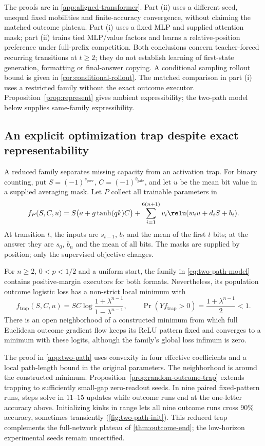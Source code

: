 The proofs are in \cref{app:aligned-transformer}. Part (ii) uses a different seed,
unequal fixed mobilities and finite-accuracy convergence, without claiming the
matched outcome plateau. Part (i) uses a fixed MLP and supplied attention mask; part (ii) trains tied
MLP/value factors and learns a relative-position preference under full-prefix
competition. Both conclusions concern teacher-forced recurring transitions
at $t\ge2$; they do not establish learning of first-state generation,
formatting or final-answer copying. A conditional sampling rollout bound is given in \cref{cor:conditional-rollout}.
The matched comparison in part (i) uses a restricted family without the exact
outcome executor. Proposition~\ref{prop:represent} gives ambient expressibility;
the two-path model below supplies same-family expressibility.

\subsection{An explicit optimization trap despite exact representability}
\label{sec:two-path-trap}
A reduced family separates missing capacity from an activation trap. For binary
counting, put $S=(-1)^{s_{\mathrm{prev}}}$, $C=(-1)^{b_{\mathrm{gate}}}$,
and let $u$ be the mean bit value in a supplied averaging mask. Let $P$ collect all trainable parameters in
\begin{equation}
 f_P(S,C,u)=S\bigl(a+g\tanh(qk)C\bigr)
 +\sum_{i=1}^{6(n+1)}v_i\relu(w_i u+d_iS+b_i).
 \label{eq:two-path-model}
\end{equation}
At transition $t$, the inputs are $s_{t-1}$, $b_t$ and the mean of the first
$t$ bits; at the answer they are $s_0$, $b_n$ and the mean of all bits.
The masks are supplied by position; only the supervised objective changes.

\begin{proposition}
\label{prop:two-path-trap}
For $n\ge2$, $0<p<1/2$ and a uniform start, the family in
\cref{eq:two-path-model} contains positive-margin executors for both formats.
Nevertheless, its population outcome logistic loss has a non-strict local minimum
with
\[
 f_{\mathrm{trap}}(S,C,u)=S C\log\frac{1+\lambda^{n-1}}{1-\lambda^{n-1}},
 \qquad \Pr(Yf_{\mathrm{trap}}>0)=\frac{1+\lambda^{n-1}}2<1.
\]
There is an open neighborhood of a constructed minimum from which full
Euclidean outcome gradient flow keeps its ReLU pattern fixed and converges
to a minimum with these logits, although the family's global loss infimum is zero.
\end{proposition}
The proof in \cref{app:two-path} uses convexity in four effective coefficients
and a local path-length bound in the original parameters. The neighborhood is
around the constructed minimum. Proposition~\ref{prop:random-outcome-trap}
extends trapping to sufficiently small-gap zero-readout seeds. In nine paired fixed-pattern runs, steps solve in $11$--$15$ updates while
outcome runs end at the one-letter accuracy above. Initializing kinks in range
lets all nine outcome runs cross $90\%$ accuracy, sometimes transiently
(\cref{fig:two-path-init}). This reduced trap complements the full-network plateau
of \cref{thm:outcome-end}; the low-horizon experimental seeds remain uncertified.

